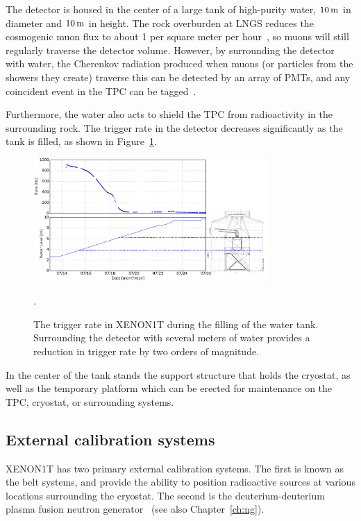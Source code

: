 The detector is housed in the center of a large tank of high-purity water, $10\,\mathrm{m}$ in diameter and $10\,\mathrm{m}$ in height. The rock overburden at LNGS reduces the cosmogenic muon flux to about 1 per square meter per hour~\cite{Bellini:2012te}, so muons will still regularly traverse the detector volume. However, by surrounding the detector with water, the Cherenkov radiation produced when muons (or particles from the showers they create) traverse this can be detected by an array of PMTs, and any coincident event in the TPC can be tagged~\cite{Aprile:2014zvw}.

Furthermore, the water also acts to shield the TPC from radioactivity in the surrounding rock. The trigger rate in the detector decreases significantly as the tank is filled, as shown in Figure~\ref{fig:waterlevel}.

\begin{figure}[htb]
    \begin{center}
    \includegraphics[width=0.8\textwidth]{figures/xe1t/water_level_part_2}
    \end{center}
    \caption{The trigger rate in XENON1T during the filling of the water tank. Surrounding the detector with several meters of water provides a reduction in trigger rate by two orders of magnitude.}\label{fig:waterlevel}.
\end{figure}

In the center of the tank stands the support structure that holds the cryostat, as well as the temporary platform which can be erected for maintenance on the TPC, cryostat, or surrounding systems.

\subsection{External calibration systems}

XENON1T has two primary external calibration systems. The first is known as the belt systems, and provide the ability to position radioactive sources at various locations surrounding the cryostat. The second is the deuterium-deuterium plasma fusion neutron generator~\cite{Lang:2017ymt} (see also Chapter~\ref{ch:ng}).

